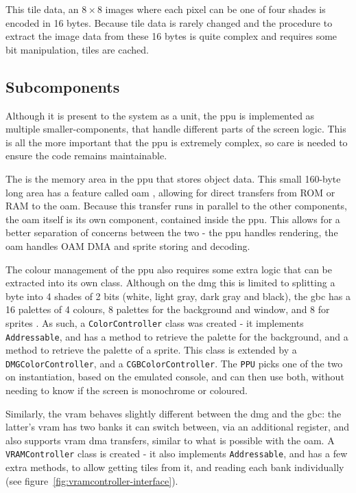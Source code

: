 \documentclass[11pt]{informatics-report}
\begin{document}
This tile data, an $8 \times 8$ images where each pixel can be one of four shades is encoded in 16 bytes. Because tile data is rarely changed and the procedure to extract the image data from these 16 bytes is quite complex and requires some bit manipulation, tiles are cached.


\subsection{Subcomponents}

Although it is present to the system as a unit, the \gls{ppu} is implemented as multiple smaller-components, that handle different parts of the screen logic. This is all the more important that the \gls{ppu} is extremely complex, so care is needed to ensure the code remains maintainable.

The  is the memory area in the \gls{ppu} that stores object data. This small 160-byte long area has a feature called \gls{oam} , allowing for direct transfers from ROM or RAM to the \gls{oam}. Because this transfer runs in parallel to the other components, the \gls{oam} itself is its own component, contained inside the \gls{ppu}. This allows for a better separation of concerns between the two - the \gls{ppu} handles rendering, the \gls{oam} handles OAM DMA and sprite storing and decoding.

The colour management of the \gls{ppu} also requires some extra logic that can be extracted into its own class. Although on the \gls{dmg} this is limited to splitting a byte into 4 shades of 2 bits (white, light gray, dark gray and black), the \gls{gbc} has a 16 palettes of 4 colours, 8 palettes for the background and window, and 8 for sprites \cite[Palettes]{pandoc}. As such, a \texttt{ColorController} class was created - it implements \texttt{Addressable}, and has a method to retrieve the palette for the background, and a method to retrieve the palette of a sprite. This class is extended by a \texttt{DMGColorController}, and a \texttt{CGBColorController}. The \texttt{PPU} picks one of the two on instantiation, based on the emulated console, and can then use both, without needing to know if the screen is monochrome or coloured.

Similarly, the \gls{vram} behaves slightly different between the \gls{dmg} and the \gls{gbc}: the latter's \gls{vram} has two banks it can switch between, via an additional register, and also supports \gls{vram} \gls{dma} transfers, similar to what is possible with the \gls{oam}. A \texttt{VRAMController} class is created - it also implements \texttt{Addressable}, and has a few extra methods, to allow getting tiles from it, and reading each bank individually (see figure~\ref{fig:vramcontroller-interface}).
\end{document}
